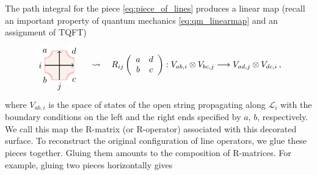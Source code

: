 The path integral for the piece \eqref{eq:piece_of_lines} produces a linear map
(recall an important property of quantum mechanics \eqref{eq:qm_linearmap} and
an assignment of TQFT)
\begin{equation}
    \begin{tikzpicture}[scale=0.6, baseline=(x.base)]
        \node (x) at (0,0) {\vphantom{x}};

        \draw[color=red!50, fill=brown!10] (-1,-1) rectangle (1,1);

        \fill[color=white] (-1,1) circle (0.5);  \node (a) at (-1,1) {$a$};
        \draw[draw=red!50, double]  (-1,0.5) arc (-90:0:0.5);
        \fill[color=white] (-1,-1) circle (0.5);  \node (b) at (-1,-1) {$b$};
        \draw[draw=red!50, double]  (-1,-0.5) arc (90:0:0.5);
        \fill[color=white] (1,-1) circle (0.5);  \node (c) at (1,-1) {$c$};
        \draw[draw=red!50, double]  (1,-0.5) arc (90:180:0.5);
        \fill[color=white] (1,1) circle (0.5);  \node (d) at (1,1) {$d$};
        \draw[draw=red!50, double]  (1,0.5) arc (-90:-180:0.5);

        \draw[thick, ->] (-1,0) node[left] {$i$} -- (1,0);
        \draw[thick, ->] (0,-1) node[below] {$j$} -- (0,1);

    \end{tikzpicture}
  \quad \rightsquigarrow \quad
R_{ij}\left(%
  \begin{array}{cc}
        a & d\\
        b & c
  \end{array}%
\right)
  :  V_{ab,i}\otimes V_{bc,j}  \longrightarrow  V_{ad,j}\otimes V_{dc,i} \, ,
\end{equation}
where $V_{ab,i}$ is the space of states of the open string propagating
along $\mathcal{L}_{i}$ with the boundary conditions on the left
and the right ends specified by $a,\,b$, respectively. We call this
map the R-matrix (or R-operator) associated with this decorated surface.
To reconstruct the original configuration of line operators, we glue these
pieces together. Gluing them amounts to the composition of R-matrices.
For example, gluing two pieces horizontally gives

